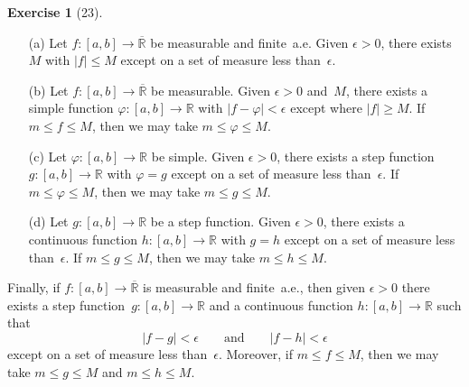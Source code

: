 \documentclass[letterpaper,12pt]{article}
\newcommand{\R}{\mathbb{R}}
\newcommand{\Rex}{\overline{\R}}
\newcommand{\abs}[1]{|{#1}|}
\theoremstyle{plain}
\theoremstyle{definition}
\newtheorem*{exer}{Exercise}
\theoremstyle{remark}
\begin{document}
\begin{exer}[23]\ 
\begin{enumerate}
\item[(a)] Let \(f:[a,b]\to\Rex\) be measurable and finite~a.e. Given \(\epsilon>0\), there exists~\(M\) with \(\abs{f}\le M\) except on a set of measure less than~\(\epsilon\).
\item[(b)] Let \(f:[a,b]\to\Rex\) be measurable. Given \(\epsilon>0\) and~\(M\), there exists a simple function \(\varphi:[a,b]\to\R\) with \(\abs{f-\varphi}<\epsilon\) except where \(\abs{f}\ge M\). If \(m\le f\le M\), then we may take \(m\le\varphi\le M\).
\item[(c)] Let \(\varphi:[a,b]\to\R\) be simple. Given \(\epsilon>0\), there exists a step function \(g:[a,b]\to\R\) with \(\varphi=g\) except on a set of measure less than~\(\epsilon\). If \(m\le\varphi\le M\), then we may take \(m\le g\le M\).
\item[(d)] Let \(g:[a,b]\to\R\) be a step function. Given \(\epsilon>0\), there exists a continuous function \(h:[a,b]\to\R\) with \(g=h\) except on a set of measure less than~\(\epsilon\). If \(m\le g\le M\), then we may take \(m\le h\le M\).
\end{enumerate}
Finally, if \(f:[a,b]\to\Rex\) is measurable and finite~a.e., then given \(\epsilon>0\) there exists a step function~\(g:[a,b]\to\R\) and a continuous function \(h:[a,b]\to\R\) such that
\[\abs{f-g}<\epsilon\qquad\text{and}\qquad\abs{f-h}<\epsilon\]
except on a set of measure less than~\(\epsilon\). Moreover, if \(m\le f\le M\), then we may take \(m\le g\le M\) and \(m\le h\le M\).
\end{exer}
\end{document}
